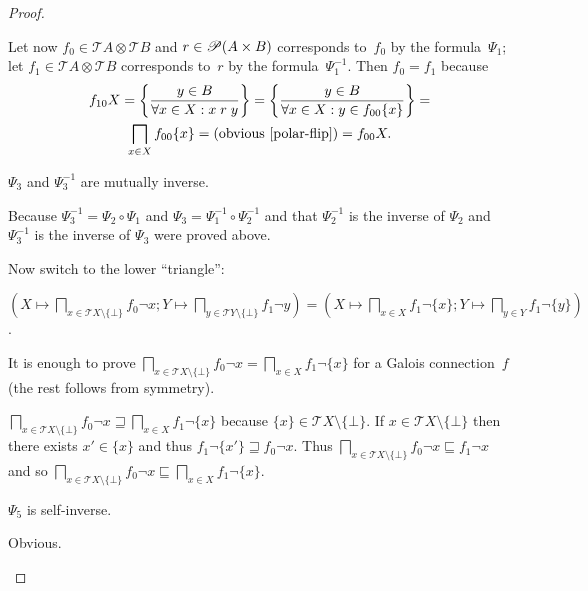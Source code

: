 \begin{proof}
\begin{claimproof}
Let now $f_{0}\in\mathscr{T}A\otimes\mathscr{T}B$ and $r\in\mathscr{P}(A\times B)$
corresponds to~$f_{0}$ by the formula~$\Psi_1$; let $f_{1}\in\mathscr{T}A\otimes\mathscr{T}B$
corresponds to~$r$ by the formula~$\Psi_1^{-1}$. Then $f_0=f_1$ because
\begin{multline*}
f_{10} X = \left\{ \frac{y\in B}{\forall x\in X:x\mathrel{r}y}\right\} = \left\{ \frac{y\in B}{\forall x\in X:y\in f_{00}\{x\}}\right\} = \\
\bigsqcap_{x\in X}f_{00}\{x\} = \text{(obvious~\ref{polar-flip})} = f_{00}X.
\end{multline*}
\end{claimproof}

\begin{claim}
$\Psi_3$ and $\Psi_3^{-1}$ are mutually inverse.
\end{claim}
\begin{claimproof}
Because $\Psi_3^{-1} = \Psi_2\circ\Psi_1$ and $\Psi_3 = \Psi_1^{-1}\circ\Psi_2^{-1}$
and that $\Psi_2^{-1}$ is the inverse of $\Psi_2$ and $\Psi_3^{-1}$ is the inverse of $\Psi_3$ were proved above.
\end{claimproof}

Now switch to the lower ``triangle'':

\begin{flushleft}
\begin{claim}
$\left(X\mapsto\bigsqcap_{x\in\mathscr{T}X\setminus\{\bot\}}f_0\lnot x;Y\mapsto\bigsqcap_{y\in\mathscr{T}Y\setminus\{\bot\}}f_1\lnot y\right)=\left(X\mapsto\bigsqcap_{x\in X}f_1\lnot\{x\};Y\mapsto\bigsqcap_{y\in Y}f_1\lnot\{y\}\right)$.
\end{claim}
\end{flushleft}
\begin{claimproof}
It is enough to prove $\bigsqcap_{x\in\mathscr{T}X\setminus\{\bot\}}f_0\lnot x = \bigsqcap_{x\in X}f_1\lnot\{x\}$ for a Galois connection~$f$
(the rest follows from symmetry).

$\bigsqcap_{x\in\mathscr{T}X\setminus\{\bot\}}f_0\lnot x \sqsupseteq \bigsqcap_{x\in X}f_1\lnot\{x\}$ because $\{x\}\in\mathscr{T}X\setminus\{\bot\}$.
If $x\in\mathscr{T}X\setminus\{\bot\}$ then there exists $x'\in\{x\}$ and thus $f_1\lnot\{x'\}\sqsupseteq f_0\lnot x$. Thus
$\bigsqcap_{x\in\mathscr{T}X\setminus\{\bot\}}f_0\lnot x \sqsubseteq f_1\lnot x$ and so
$\bigsqcap_{x\in\mathscr{T}X\setminus\{\bot\}}f_0\lnot x \sqsubseteq \bigsqcap_{x\in X}f_1\lnot\{x\}$.
\end{claimproof}

\begin{claim}
$\Psi_5$ is self-inverse.
\end{claim}
\begin{claimproof}
Obvious.
\end{claimproof}


\end{proof}
